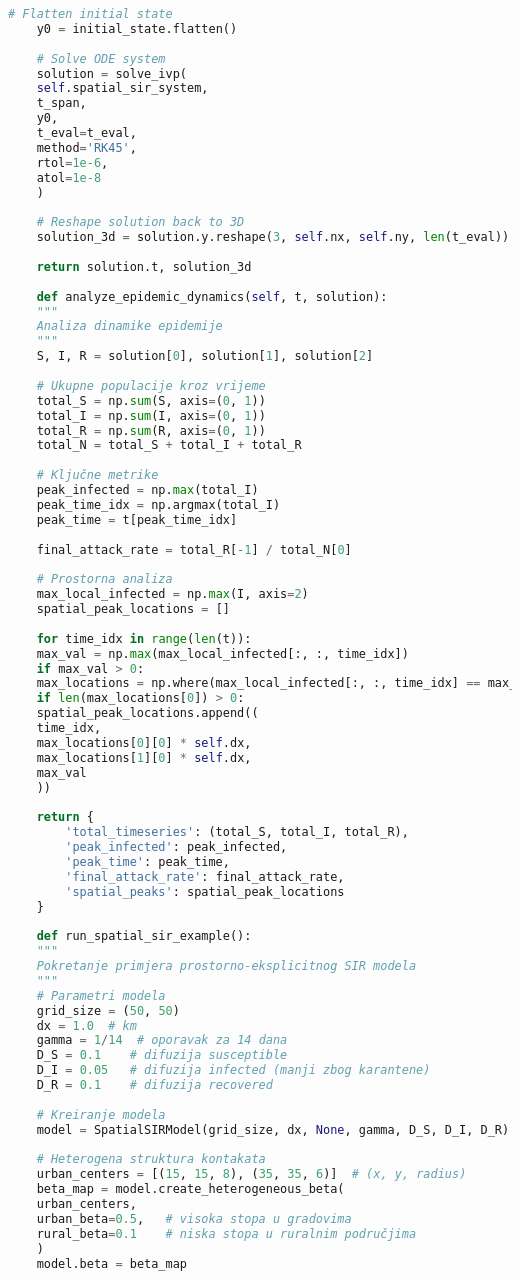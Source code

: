 \documentclass[11pt,oneside]{book}
\begin{document}
\begin{lstlisting}[language=Python, caption=SIR model s prostornom difuzijom]
	# Flatten initial state
	y0 = initial_state.flatten()
	
	# Solve ODE system
	solution = solve_ivp(
	self.spatial_sir_system,
	t_span,
	y0,
	t_eval=t_eval,
	method='RK45',
	rtol=1e-6,
	atol=1e-8
	)
	
	# Reshape solution back to 3D
	solution_3d = solution.y.reshape(3, self.nx, self.ny, len(t_eval))
	
	return solution.t, solution_3d
	
	def analyze_epidemic_dynamics(self, t, solution):
	"""
	Analiza dinamike epidemije
	"""
	S, I, R = solution[0], solution[1], solution[2]
	
	# Ukupne populacije kroz vrijeme
	total_S = np.sum(S, axis=(0, 1))
	total_I = np.sum(I, axis=(0, 1))
	total_R = np.sum(R, axis=(0, 1))
	total_N = total_S + total_I + total_R
	
	# Ključne metrike
	peak_infected = np.max(total_I)
	peak_time_idx = np.argmax(total_I)
	peak_time = t[peak_time_idx]
	
	final_attack_rate = total_R[-1] / total_N[0]
	
	# Prostorna analiza
	max_local_infected = np.max(I, axis=2)
	spatial_peak_locations = []
	
	for time_idx in range(len(t)):
	max_val = np.max(max_local_infected[:, :, time_idx])
	if max_val > 0:
	max_locations = np.where(max_local_infected[:, :, time_idx] == max_val)
	if len(max_locations[0]) > 0:
	spatial_peak_locations.append((
	time_idx, 
	max_locations[0][0] * self.dx,
	max_locations[1][0] * self.dx,
	max_val
	))
	
	return {
		'total_timeseries': (total_S, total_I, total_R),
		'peak_infected': peak_infected,
		'peak_time': peak_time,
		'final_attack_rate': final_attack_rate,
		'spatial_peaks': spatial_peak_locations
	}
	
	def run_spatial_sir_example():
	"""
	Pokretanje primjera prostorno-eksplicitnog SIR modela
	"""
	# Parametri modela
	grid_size = (50, 50)
	dx = 1.0  # km
	gamma = 1/14  # oporavak za 14 dana
	D_S = 0.1    # difuzija susceptible
	D_I = 0.05   # difuzija infected (manji zbog karantene)
	D_R = 0.1    # difuzija recovered
	
	# Kreiranje modela
	model = SpatialSIRModel(grid_size, dx, None, gamma, D_S, D_I, D_R)
	
	# Heterogena struktura kontakata
	urban_centers = [(15, 15, 8), (35, 35, 6)]  # (x, y, radius)
	beta_map = model.create_heterogeneous_beta(
	urban_centers, 
	urban_beta=0.5,   # visoka stopa u gradovima
	rural_beta=0.1    # niska stopa u ruralnim područjima
	)
	model.beta = beta_map
	

\end{lstlisting}
\end{document}
